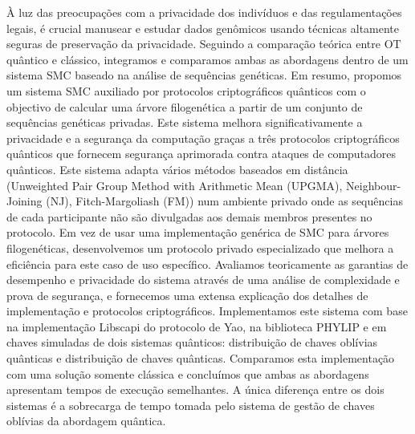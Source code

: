 \documentclass[12pt]{report}
\begin{document}
À luz das preocupações com a privacidade dos indivíduos e das regulamentações legais, é crucial manusear e estudar dados genômicos usando técnicas altamente seguras de preservação da privacidade. Seguindo a comparação teórica entre OT quântico e clássico, integramos e comparamos ambas as abordagens dentro de um sistema SMC baseado na análise de sequências genéticas. Em resumo, propomos um sistema SMC auxiliado por protocolos criptográficos quânticos com o objectivo de calcular uma árvore filogenética a partir de um conjunto de sequências genéticas privadas. Este sistema melhora significativamente a privacidade e a segurança da computação graças a três protocolos criptográficos quânticos que fornecem segurança aprimorada contra ataques de computadores quânticos. Este sistema adapta vários métodos baseados em distância (Unweighted Pair Group Method with Arithmetic Mean (UPGMA), Neighbour-Joining (NJ), Fitch-Margoliash (FM)) num ambiente privado onde as sequências de cada participante não são divulgadas aos demais membros presentes no protocolo. Em vez de usar uma implementação genérica de SMC para árvores filogenéticas, desenvolvemos um protocolo privado especializado que melhora a eficiência para este caso de uso específico. Avaliamos teoricamente as garantias de desempenho e privacidade do sistema através de uma análise de complexidade e prova de segurança, e fornecemos uma extensa explicação dos detalhes de implementação e protocolos criptográficos. Implementamos este sistema com base na implementação Libscapi do protocolo de Yao, na biblioteca PHYLIP e em chaves simuladas de dois sistemas quânticos: distribuição de chaves oblívias quânticas e distribuição de chaves quânticas. Comparamos esta implementação com uma solução somente clássica e concluímos que ambas as abordagens apresentam tempos de execução semelhantes. A única diferença entre os dois sistemas é a sobrecarga de tempo tomada pelo sistema de gestão de chaves oblívias da abordagem quântica.
\end{document}
